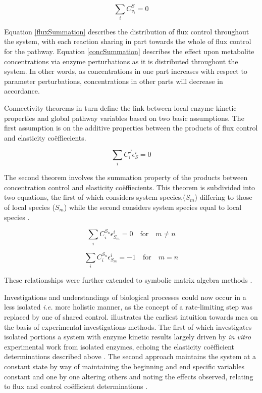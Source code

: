 \begin{equation}\label{concSummation}
\sum_{i}C_{v_i}^S=0
\end{equation}

Equation \ref{fluxSummation} describes the distribution of flux control throughout the system, with each reaction sharing in part towards the whole of flux control for the pathway. Equation \ref{concSummation} describes the effect upon metabolite concentrations via enzyme perturbations as it is distributed throughout the system. In other words, as concentrations in one part increases with respect to parameter perturbations, concentrations in other parts will decrease in accordance.

Connectivity theorems in turn define the link between local enzyme kinetic properties and global pathway variables based on two basic assumptions. The first assumption is on the additive properties between the products of flux control and elasticity co\"effiecients.

\begin{equation}
\sum_{i}C_{i}^J\epsilon_S^i=0
\end{equation}

The second theorem involves the summation property of the products between concentration control and elasticity co\"effiecients. This theorem is subdivided into two equations, the first of which considers system species,($S_m$) differing to those of local species ($S_m$) while the second considers system species equal to local species \citep{Kacser1979, Westerhoff1984}.

\begin{equation}
\sum_{i}C_{i}^{S_n}\epsilon_{S_m}^i=0\quad \textrm{for}\quad m\ne n
\end{equation}

\begin{equation}
\sum_{i}C_{i}^{S_n}\epsilon_{S_m}^i=-1\quad \textrm{for}\quad m = n
\end{equation}

These relationships were further extended to symbolic matrix algebra methods \cite{Fell1992,Kacser1995,Ehlde1997,Hofmeyr2001}.


Investigations and understandings of biological processes could now occur in a less isolated \textit{i.e.} more holistic manner, as the concept of a rate-limiting step was replaced by one of shared control. \citeauthor{Kacser1968} illustrates the earliest intuition towards \gls{mca} on the basis of experimental investigations methods. The first of which investigates isolated portions a system with enzyme kinetic results largely driven by \textit{in vitro} experimental work from isolated enzymes, echoing the elasticity co\"efficient determinations described above \citep{Hynne2001, Boren2002}. The second approach maintains the system at a constant state by way of maintaining the beginning and end specific variables constant and one by one altering others and noting the effects observed, relating to flux and control co\"efficient determinations \citep{Kacser1968}.

